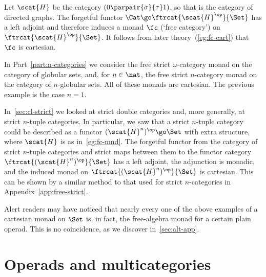 \begin{example}		
Let $\scat{H}$ be the category $(0 \parpair{\sigma}{\tau} 1)$, so that
 is the category of directed graphs.%
%
%
 The
forgetful functor $\Cat \go \ftrcat{\scat{H}^\op}{\Set}$ has a left adjoint
and therefore induces a monad $\fc$%
% 
% 
(`free category')%
%
%
on
$\ftrcat{\scat{H}^\op}{\Set}$.  It follows from later
theory~(\ref{eg:fc-cart}) that $\fc$ is cartesian.
\end{example}

\begin{example}		
In Part~\ref{part:n-categories} we consider the free strict
$\omega$-category%
%
%
monad on the category of globular%
%
%
sets, and, for
$n\in\nat$, the free strict $n$-category%
%
%
monad on the category of
$n$-globular sets.  All of these monads are cartesian.  The previous
example is the case $n=1$.
\end{example}

\begin{example}		
In~\ref{sec:cl-strict} we looked at strict double%
%
%
categories and, more
generally, at strict $n$-tuple categories.%
%
%
 In particular, we saw that a
strict $n$-tuple category could be described as a functor $(\scat{H}^n)^\op
\go \Set$ with extra structure, where $\scat{H}$ is as in~\ref{eg:fc-mnd}.
The forgetful functor from the category of strict $n$-tuple categories and
strict maps between them to the functor category
$\ftrcat{(\scat{H}^n)^\op}{\Set}$ has a left adjoint, the adjunction is
monadic, and the induced monad on $\ftrcat{(\scat{H}^n)^\op}{\Set}$ is
cartesian.  This can be shown by a similar method to that used for
strict $n$-categories in Appendix~\ref{app:free-strict}.
\end{example}

Alert readers may have noticed that nearly every one of the above examples 
of a cartesian monad on $\Set$ is, in fact, the free-algebra monad for a
certain plain operad.  This is no coincidence, as we discover
in~\ref{sec:alt-app}.



\section{Operads and multicategories}


